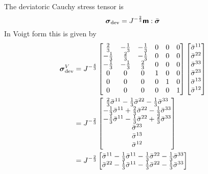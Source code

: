 The deviatoric Cauchy stress tensor is
\begin{equation}
  \boldsymbol{\mathit{\sigma}}_{\operatorname{dev}}=J^{-\frac{2}{3}} \boldsymbol{\mathsf{m}} : \bar{\boldsymbol{\mathit{\sigma}}} 
\end{equation}
In Voigt form this is given by
\begin{equation}
  \begin{split}
    \boldsymbol{\mathit{\sigma}}_{\operatorname{dev}}^{V}&=J^{-\frac{4}{3}}\begin{bmatrix}
      \frac{2}{3} & -\frac{1}{3} & -\frac{1}{3} & 0 & 0 & 0\\
      -\frac{1}{3} & \frac{2}{3} & -\frac{1}{3} & 0 & 0 & 0\\
      -\frac{1}{3} & -\frac{1}{3} & \frac{2}{3} & 0 & 0 & 0\\
      0 & 0 & 0 & 1 & 0 & 0 \\
      0 & 0 & 0 & 0 & 1 & 0 \\
      0 & 0 & 0 & 0 & 0 & 1
    \end{bmatrix}\begin{bmatrix}
      \bar{\sigma}^{11} \\
      \bar{\sigma}^{22} \\
      \bar{\sigma}^{33} \\
      \bar{\sigma}^{23} \\
      \bar{\sigma}^{13} \\
      \bar{\sigma}^{12}
    \end{bmatrix} \\
    &=J^{-\frac{2}{3}}\begin{bmatrix}
      \frac{2}{3}\bar{\sigma}^{11}-\frac{1}{3}\bar{\sigma}^{22}-\frac{1}{3}\bar{\sigma}^{33} \\
      -\frac{1}{3}\bar{\sigma}^{11}+\frac{2}{3}\bar{\sigma}^{22}-\frac{1}{3}\bar{\sigma}^{33} \\
      -\frac{1}{3}\bar{\sigma}^{11}-\frac{1}{3}\bar{\sigma}^{22}+\frac{2}{3}\bar{\sigma}^{33} \\
      \bar{\sigma}^{23} \\
      \bar{\sigma}^{13} \\
      \bar{\sigma}^{12}
    \end{bmatrix} \\
    &=J^{-\frac{2}{3}}\begin{bmatrix}
      \bar{\sigma}^{11}-\frac{1}{3}\bar{\sigma}^{11}-\frac{1}{3}\bar{\sigma}^{22}-\frac{1}{3}\bar{\sigma}^{33} \\
      \bar{\sigma}^{22}-\frac{1}{3}\bar{\sigma}^{11}-\frac{1}{3}\bar{\sigma}^{22}-\frac{1}{3}\bar{\sigma}^{33} \\

\end{bmatrix}
\end{split}
\end{equation}

